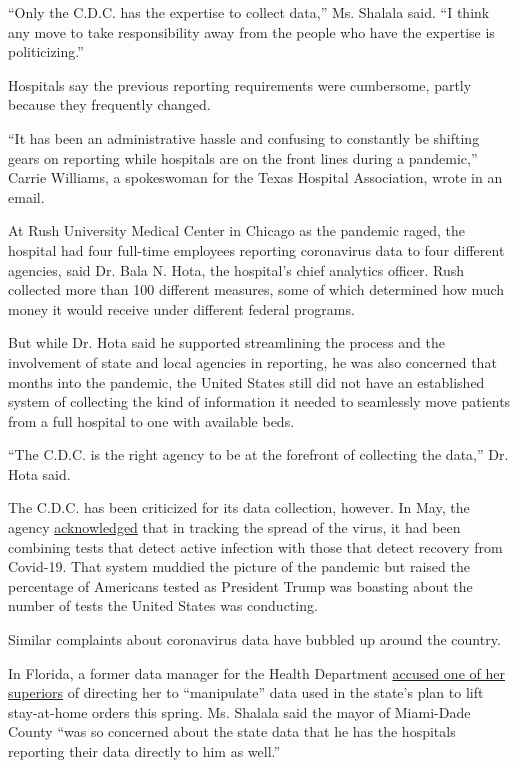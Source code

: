 ``Only the C.D.C. has the expertise to collect data,'' Ms. Shalala said.
``I think any move to take responsibility away from the people who have
the expertise is politicizing.''

Hospitals say the previous reporting requirements were cumbersome,
partly because they frequently changed.

``It has been an administrative hassle and confusing to constantly be
shifting gears on reporting while hospitals are on the front lines
during a pandemic,'' Carrie Williams, a spokeswoman for the Texas
Hospital Association, wrote in an email.

At Rush University Medical Center in Chicago as the pandemic raged, the
hospital had four full-time employees reporting coronavirus data to four
different agencies, said Dr. Bala N. Hota, the hospital's chief
analytics officer. Rush collected more than 100 different measures, some
of which determined how much money it would receive under different
federal programs.

But while Dr. Hota said he supported streamlining the process and the
involvement of state and local agencies in reporting, he was also
concerned that months into the pandemic, the United States still did not
have an established system of collecting the kind of information it
needed to seamlessly move patients from a full hospital to one with
available beds.

``The C.D.C. is the right agency to be at the forefront of collecting
the data,'' Dr. Hota said.

The C.D.C. has been criticized for its data collection, however. In May,
the agency
\href{https://www.nytimes3xbfgragh.onion/2020/05/22/us/politics/coronavirus-tests-cdc.html}{acknowledged}
that in tracking the spread of the virus, it had been combining tests
that detect active infection with those that detect recovery from
Covid-19. That system muddied the picture of the pandemic but raised the
percentage of Americans tested as President Trump was boasting about the
number of tests the United States was conducting.

Similar complaints about coronavirus data have bubbled up around the
country.

In Florida, a former data manager for the Health Department
\href{https://www.tampabay.com/news/health/2020/05/22/ousted-manager-was-told-to-manipulate-covid-19-data-before-states-re-opening-she-says/}{accused
one of her superiors} of directing her to ``manipulate'' data used in
the state's plan to lift stay-at-home orders this spring. Ms. Shalala
said the mayor of Miami-Dade County ``was so concerned about the state
data that he has the hospitals reporting their data directly to him as
well.''

